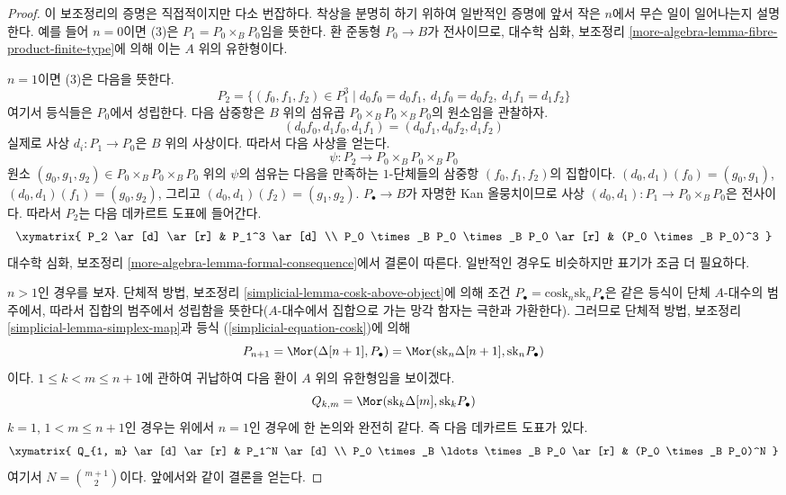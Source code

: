 \begin{proof}
이 보조정리의 증명은 직접적이지만 다소 번잡하다. 착상을 분명히 하기
위하여 일반적인 증명에 앞서 작은 $n$에서 무슨 일이 일어나는지 설명한다.
예를 들어 $n=0$이면 (3)은 $P_1=P_0\times_BP_0$임을 뜻한다. 환 준동형
$P_0\to B$가 전사이므로, 대수학 심화, 보조정리
\ref{more-algebra-lemma-fibre-product-finite-type}에 의해 이는 $A$ 위의
유한형이다.

\medskip\noindent
$n=1$이면 (3)은 다음을 뜻한다.
$$
P_2 = \{(f_0, f_1, f_2) \in P_1^3 \mid
d_0f_0 = d_0f_1,\ d_1f_0 = d_0f_2,\ d_1f_1 = d_1f_2 \}
$$
여기서 등식들은 $P_0$에서 성립한다. 다음 삼중항은 $B$ 위의 섬유곱
$P_0\times_BP_0\times_BP_0$의 원소임을 관찰하자.
$$
(d_0f_0, d_1f_0, d_1f_1) = (d_0f_1, d_0f_2, d_1f_2)
$$
실제로 사상 $d_i:P_1\to P_0$은 $B$ 위의 사상이다. 따라서 다음 사상을
얻는다.
$$
\psi : P_2 \longrightarrow P_0 \times_B P_0 \times_B P_0
$$
원소 $(g_0,g_1,g_2)\in P_0\times_BP_0\times_BP_0$ 위의 $\psi$의 섬유는
다음을 만족하는 $1$-단체들의 삼중항 $(f_0,f_1,f_2)$의 집합이다.
$(d_0,d_1)(f_0)=(g_0,g_1)$,
$(d_0,d_1)(f_1)=(g_0,g_2)$, 그리고
$(d_0,d_1)(f_2)=(g_1,g_2)$. $P_\bullet\to B$가 자명한 Kan
올뭉치이므로 사상 $(d_0,d_1):P_1\to P_0\times_BP_0$은 전사이다.
따라서 $P_2$는 다음 데카르트 도표에 들어간다.
$$
\xymatrix{
P_2 \ar[d] \ar[r] & P_1^3 \ar[d] \\
P_0 \times_B P_0 \times_B P_0 \ar[r] & (P_0 \times_B P_0)^3
}
$$
대수학 심화, 보조정리 \ref{more-algebra-lemma-formal-consequence}에서 결론이
따른다. 일반적인 경우도 비슷하지만 표기가 조금 더 필요하다.

\medskip\noindent
$n>1$인 경우를 보자. 단체적 방법, 보조정리
\ref{simplicial-lemma-cosk-above-object}에 의해 조건
$P_\bullet=\text{cosk}_n\text{sk}_nP_\bullet$은 같은 등식이 단체
$A$-대수의 범주에서, 따라서 집합의 범주에서 성립함을 뜻한다($A$-대수에서
집합으로 가는 망각 함자는 극한과 가환한다). 그러므로 단체적 방법,
보조정리 \ref{simplicial-lemma-simplex-map}과 등식
(\ref{simplicial-equation-cosk})에 의해
$$
P_{n + 1} =
\Mor(\Delta[n + 1], P_\bullet) =
\Mor(\text{sk}_n \Delta[n + 1], \text{sk}_n P_\bullet)
$$
이다. $1\leq k<m\leq n+1$에 관하여 귀납하여 다음 환이 $A$ 위의
유한형임을 보이겠다.
$$
Q_{k, m} = \Mor(\text{sk}_k \Delta[m], \text{sk}_k P_\bullet)
$$
$k=1$, $1<m\leq n+1$인 경우는 위에서 $n=1$인 경우에 한 논의와 완전히
같다. 즉 다음 데카르트 도표가 있다.
$$
\xymatrix{
Q_{1, m} \ar[d] \ar[r] & P_1^N \ar[d] \\
P_0 \times_B \ldots \times_B P_0 \ar[r] & (P_0 \times_B P_0)^N
}
$$
여기서 $N={m+1\choose2}$이다. 앞에서와 같이 결론을 얻는다.


\end{proof}
